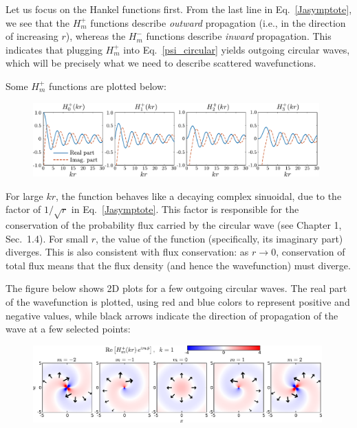\documentclass[pra,12pt]{revtex4-2}
\begin{document}
Let us focus on the Hankel functions first.  From the last line in
Eq.~\eqref{Jasymptote}, we see that the $H_m^+$ functions describe
\textit{outward} propagation (i.e., in the direction of increasing
$r$), whereas the $H_m^-$ functions describe \textit{inward}
propagation.  This indicates that plugging $H_m^+$ into
Eq.~\eqref{psi_circular} yields outgoing circular waves, which will be
precisely what we need to describe scattered wavefunctions.

\clearpage

Some $H_m^+$ functions are plotted below:

\begin{figure}[h]
  \centering\includegraphics[width=0.98\textwidth]{besselh}
\end{figure}

\noindent
For large $kr$, the function behaves like a decaying complex
sinuoidal, due to the factor of $1/\sqrt{r}$ in
Eq.~\eqref{Jasymptote}.  This factor is responsible for the
conservation of the probability flux carried by the circular wave (see
Chapter 1, Sec.~1.4).  For small $r$, the value of the function
(specifically, its imaginary part) diverges.  This is also consistent
with flux conservation: as $r \rightarrow 0$, conservation of total
flux means that the flux density (and hence the wavefunction) must
diverge.

The figure below shows 2D plots for a few outgoing circular waves.
The real part of the wavefunction is plotted, using red and blue
colors to represent positive and negative values, while black arrows
indicate the direction of propagation of the wave at a few selected
points:

\vskip 0.1in
\begin{figure}[h!]
  \centering\includegraphics[width=0.99\textwidth]{bessels}
\end{figure}
\end{document}
